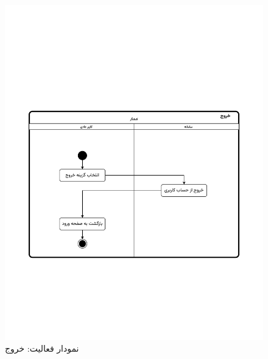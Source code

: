 \begin{figure}[ht!]
	\centering
	\includegraphics[scale=0.8, page=1]{figs/OOD-activity-logout.pdf}
	\caption{نمودار فعالیت: خروج}
\end{figure}
\FloatBarrier
\newpage

